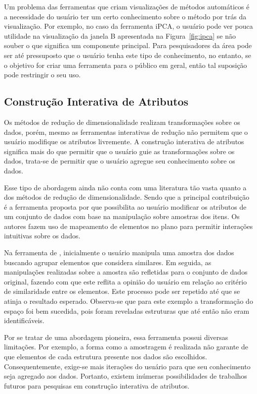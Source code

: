 Um problema das ferramentas que criam visualizações de métodos
automáticos é a necessidade do usuário ter um certo
conhecimento sobre o método por trás da visualização. Por
exemplo, no caso da ferramenta iPCA, o usuário pode ver
pouca utilidade na visualização da janela B apresentada na
Figura~\ref{fig:ipca} se não souber o que significa um
componente principal. Para pesquisadores da área pode ser
até pressuposto que o usuário tenha este tipo de
conhecimento, no entanto, se o objetivo for criar uma
ferramenta para o público em geral, então tal suposição pode
restringir o seu uso.

\subsection{Construção Interativa de Atributos}\label{sec:tr}

Os métodos de redução de dimensionalidade realizam
transformações sobre os dados, porém, mesmo as ferramentas
interativas de redução não permitem que o usuário modifique
os atributos livremente. A construção interativa de
atributos significa mais do que permitir que o usuário guie
as transformações sobre os dados, trata-se de permitir que o
usuário agregue seu conhecimento sobre os dados. 

Esse tipo de abordagem ainda não conta com uma literatura
tão vasta quanto a dos métodos de redução de
dimensionalidade. Sendo que a principal contribuição é a
ferramenta proposta por \citet{Gladys2013} que possibilita ao
usuário modificar os atributos de um conjunto de dados com
base na manipulação sobre amostras dos itens. Os autores
fazem uso de mapeamento de elementos no plano para permitir
interações intuitivas sobre os dados. 

Na ferramenta de \citeauthor{Gladys2013}, inicialmente o
usuário manipula uma amostra dos dados buscando  agrupar
elementos que considera similares.  Em seguida, as
manipulações realizadas sobre a amostra são refletidas para
o conjunto de dados original, fazendo com que este reflita a
opinião do usuário em relação ao critério de similaridade
entre os elementos. Este processo pode ser repetido até que
se atinja o resultado esperado. Observa-se que para este
exemplo a transformação do espaço foi bem sucedida, pois
foram reveladas estruturas que até então não eram
identificáveis.

Por se tratar de uma abordagem pioneira, essa ferramenta
possui diversas limitações. Por exemplo, a forma como a
amostragem é realizada não garante de que elementos de cada
estrutura presente nos dados são escolhidos.
Consequentemente, exige-se mais iterações do usuário 
para que seu conhecimento seja agregado aos dados. Portanto,
existem inúmeras possibilidades de trabalhos futuros para
pesquisas em construção interativa de atributos.

